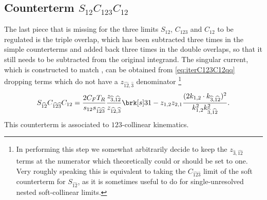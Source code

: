 \documentclass[11pt,a4paper]{article}
\newcommand{\mgd}[1]{\widehat{#1}}
\begin{document}
\begin{comment}
A potential drawback of this choice is that
it makes the subtraction of disjoint collinear limits more complicated.
In fact, within the formula
\begin{equation}
	1
	- C_{12} - C_{34}
	+ C_{\mgd{3}\mgd{4}} C_{12} + C_{\mgd{1}\mgd{2}} C_{34}
	- C_{12;34},
\end{equation}
the last three terms, which all feature the same kinematics
thanks to the commutativity property of the rescaling mapping,
now differ \emph{only} because of jacobian factors.	
\end{comment}


\subsection{Counterterm $S_{12}C_{123}C_{12}$}

The last piece that is missing for the three limits
$S_{12}$, $C_{123}$ and $C_{12}$ to be regulated is the triple overlap,
which has been subtracted three times in the simple counterterms
and added back three times in the double overlaps,
so that it still needs to be subtracted from the original integrand.
The singular current, which is constructed to match \cite{Somogyi:2006da},
can be obtained from \cref{eq:iterC123C12qq} dropping terms
which do not have a $z_{\mgd{12},\mgd{3}}$ denominator%
\footnote{
In performing this step we somewhat arbitrarily decide
to keep the $z_{\mgd{3},\mgd{12}}$ terms at the numerator
which theoretically could or should be set to one.
Very roughly speaking this is equivalent to taking
the $C_{\mgd{12}\mgd{3}}$ limit of the soft counterterm for $S_{\mgd{12}}$,
as it is sometimes useful to do for single-unresolved
nested soft-collinear limits.
}
\begin{equation}
	S_{\mgd{12}} C_{\mgd{12}\mgd{3}} C_{12}
	= \frac{2 C_F T_R}{s_{12}s_{\mgd{12}\mgd{3}}}
	\frac{z_{\mgd{3},\mgd{12}}}{z_{\mgd{12},\mgd{3}}}
	\brk[s]3{
		1 - z_{1,2} z_{2,1}
		\frac{(2k_{1,2}\cdot k_{\mgd{3},\mgd{12}})^2}
		{k_{1,2}^2 k_{\mgd{3},\mgd{12}}^2}
	}.
\end{equation}
This counterterm is associated to $123$-collinear kinematics.
\end{document}
